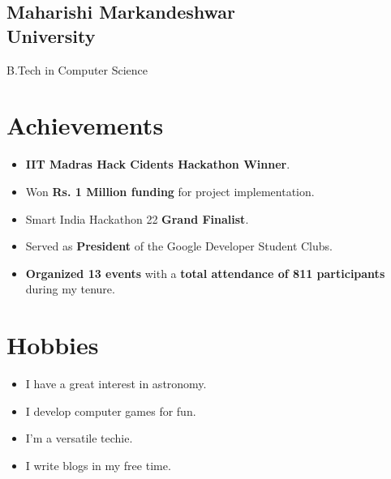 \documentclass[]{deedy-resume-reversed}
\begin{document}
\begin{minipage}[t]{0.33\textwidth}
\subsection{Maharishi Markandeshwar \\University}
\vspace{0.1cm}
B.Tech in Computer Science \\
\sectionsep


\section*{Achievements}
\begin{itemize}
    \item \textbf{IIT Madras Hack Cidents Hackathon Winner}.
    \item Won \textbf{Rs. 1 Million funding} for project implementation.
    \item Smart India Hackathon 22 \textbf{Grand Finalist}.
    \item Served as \textbf{President} of the Google Developer Student Clubs.
    \item \textbf{Organized 13 events} with a \textbf{total attendance of 811 participants} during my tenure.
\end{itemize}



\section*{Hobbies}
\begin{itemize}
    \item I have a great interest in astronomy.
    \item I develop computer games for fun.
    \item I'm a versatile techie.
    \item I write blogs in my free time.
\end{itemize}



\end{minipage}
\end{document}
